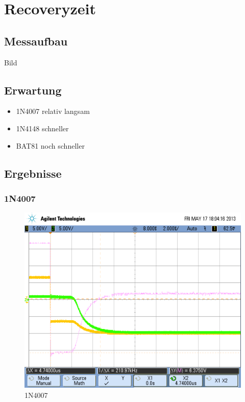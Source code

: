 
\section{Recoveryzeit}

\subsection{Messaufbau}
\begin{frame}
Bild
\end{frame}

\subsection{Erwartung}
\begin{frame}
  \begin{itemize}
    \item 1N4007 relativ langsam
    \item 1N4148 schneller
    \item BAT81 noch schneller
  \end{itemize}
\end{frame}

\subsection{Ergebnisse}
\subsubsection{1N4007}
\begin{frame}
  \begin{figure}
    \includegraphics[width=1.0\columnwidth]{fig/scope_18.png}
    \caption{1N4007}
  \end{figure}
\end{frame}

